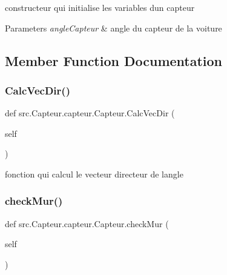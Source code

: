 constructeur qui initialise les variables d\textquotesingle{}un capteur 


\begin{DoxyParams}{Parameters}
{\em angle\+Capteur} & angle du capteur de la voiture \\
\hline
\end{DoxyParams}


\subsection{Member Function Documentation}
\mbox{\label{classsrc_1_1_capteur_1_1capteur_1_1_capteur_a620b8aef4fd51d712725e22cb80c4c15}} 
\subsubsection{\texorpdfstring{Calc\+Vec\+Dir()}{CalcVecDir()}}
{\footnotesize\ttfamily def src.\+Capteur.\+capteur.\+Capteur.\+Calc\+Vec\+Dir (\begin{DoxyParamCaption}\item[{}]{self }\end{DoxyParamCaption})}



fonction qui calcul le vecteur directeur de l\textquotesingle{}angle 

\mbox{\label{classsrc_1_1_capteur_1_1capteur_1_1_capteur_a4a3d1935b2f2f78b1b95b1ea72632d88}} 
\subsubsection{\texorpdfstring{check\+Mur()}{checkMur()}}
{\footnotesize\ttfamily def src.\+Capteur.\+capteur.\+Capteur.\+check\+Mur (\begin{DoxyParamCaption}\item[{}]{self }\end{DoxyParamCaption})}



